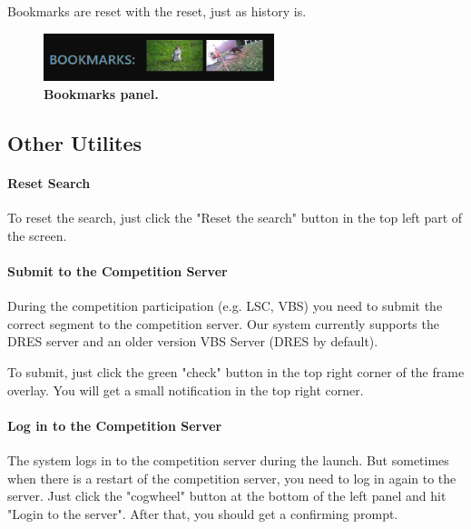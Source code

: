Bookmarks are reset with the reset, just as history is.

\begin{figure}[h]
	\centering
	\includegraphics[width=0.6\textwidth]{img/bookmarks-panel.png}
  \caption{\textbf{Bookmarks panel.}}
	\label{fig:bookmarks}
\end{figure}

\subsection{Other Utilites}
\paragraph{Reset Search}
\label{par:reset}
To reset the search, just click the "Reset the search" button in the top left part of the screen.

\paragraph{Submit to the Competition Server}
During the competition participation (e.g. LSC, VBS) you need to submit the correct segment to the competition server. Our system currently supports the DRES server and an older version VBS Server (DRES by default). 

To submit, just click the green "check" button in the top right corner of the frame overlay. You will get a small notification in the top right corner.

\paragraph{Log in to the Competition Server}
The system logs in to the competition server during the launch. But sometimes when there is a restart of the competition server, you need to log in again to the server. Just click the "cogwheel" button at the bottom of the left panel and hit "Login to the server". After that, you should get a confirming prompt. 





